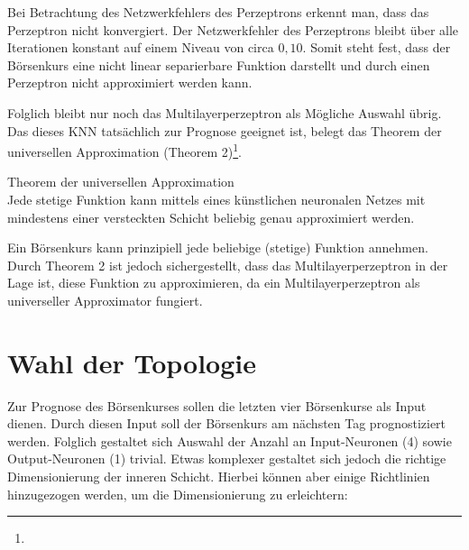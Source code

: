 Bei Betrachtung des Netzwerkfehlers des Perzeptrons erkennt man, dass das Perzeptron nicht konvergiert. Der Netzwerkfehler des Perzeptrons bleibt über alle Iterationen konstant auf einem Niveau von circa $0,10$. Somit steht fest, dass der Börsenkurs eine nicht linear separierbare Funktion darstellt und durch einen Perzeptron nicht approximiert werden kann.

Folglich bleibt nur noch das Multilayerperzeptron als Mögliche Auswahl übrig. Das dieses KNN tatsächlich zur Prognose geeignet ist, belegt das Theorem der universellen Approximation (Theorem 2)\footnote{\Vgl{}}.

\begin{theo}Theorem der universellen Approximation\\
Jede stetige Funktion kann mittels eines künstlichen neuronalen Netzes mit mindestens einer versteckten Schicht beliebig genau approximiert werden.
\end{theo}

Ein Börsenkurs kann prinzipiell jede beliebige (stetige) Funktion annehmen. Durch Theorem 2 ist jedoch sichergestellt, dass das Multilayerperzeptron in der Lage ist, diese Funktion zu approximieren, da ein Multilayerperzeptron als universeller Approximator fungiert.

\section{Wahl der Topologie}
\label{section:Wahl der Topologie}

Zur Prognose des Börsenkurses sollen die letzten vier Börsenkurse als Input dienen. Durch diesen Input soll der Börsenkurs am nächsten Tag prognostiziert werden. Folglich gestaltet sich Auswahl der Anzahl an Input-Neuronen (4) sowie Output-Neuronen (1) trivial.
Etwas komplexer gestaltet sich jedoch die richtige Dimensionierung der inneren Schicht. Hierbei können aber einige Richtlinien hinzugezogen werden, um die Dimensionierung zu erleichtern:

